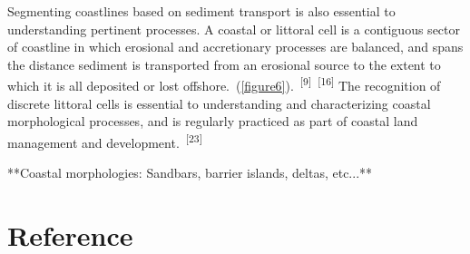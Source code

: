 \documentclass{article}
\begin{document}
\newpage
{}
\fancyfoot[C]{\thepage} 
\thispagestyle{fancy}

{Segmenting coastlines based on sediment transport is also essential to understanding pertinent processes. A coastal or littoral cell is a contiguous sector of coastline in which erosional and accretionary processes are balanced, and spans the distance sediment is transported from an erosional source to the extent to which it is all deposited or lost offshore.~(\cref{figure6}).~\textsuperscript{[9]}~\textsuperscript{[16]}} The recognition of discrete littoral cells is essential to understanding and characterizing coastal morphological processes, and is regularly practiced as part of coastal land management and development.~\textsuperscript{[23]}



\par{**Coastal morphologies: Sandbars, barrier islands, deltas, etc...**}

\newpage
{}
\fancyfoot[C]{\thepage} 
\thispagestyle{fancy}
\section{Reference}
\end{document}
